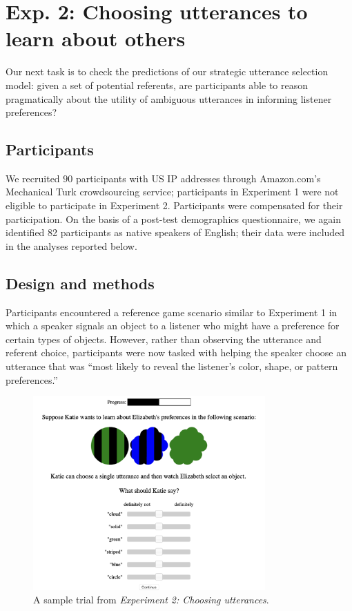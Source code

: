 \documentclass[10pt,a4paper]{article}
\begin{document}




\section{Exp. 2: Choosing utterances to learn about others}

Our next task is to check the predictions of our strategic utterance selection model: given a set of potential referents, are participants able to reason pragmatically about the utility of ambiguous utterances in informing listener preferences?

\subsection{Participants}

We recruited $90$ participants with US IP addresses through Amazon.com's Mechanical Turk crowdsourcing service; participants in Experiment 1 were not eligible to participate in Experiment 2. Participants were compensated for their participation. On the basis of a post-test demographics questionnaire, we again identified  82 participants as native speakers of English; their data were included in the analyses reported below.

\subsection{Design and methods}

Participants encountered a reference game scenario similar to Experiment 1 in which a speaker signals an object to a listener who might have a preference for certain types of objects. However, rather than observing the utterance and referent choice, participants were now tasked with helping the speaker choose an utterance that was ``most likely to reveal the listener's color, shape, or pattern preferences.''

\begin{figure}[ht]
	\centering
	\includegraphics[width=3.5in]{images/utterance-choice-trial.png}
	\caption{A sample trial from \emph{Experiment 2: Choosing utterances}. }\label{exp2-trial}
\end{figure} 
\end{document}
